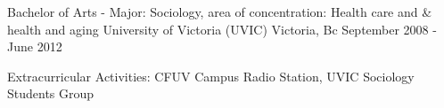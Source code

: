 

\begin{cventries}

  \cventry
    {Bachelor of Arts - Major: Sociology, area of concentration: Health care and \& health and aging} %
    {University of Victoria (UVIC)} %
    {Victoria, Bc} %
    {September 2008 - June 2012} %
    {
      \begin{cvitems} %
        \item {Extracurricular Activities: CFUV Campus Radio Station, UVIC Sociology Students Group}
      \end{cvitems}
    }

\end{cventries}
